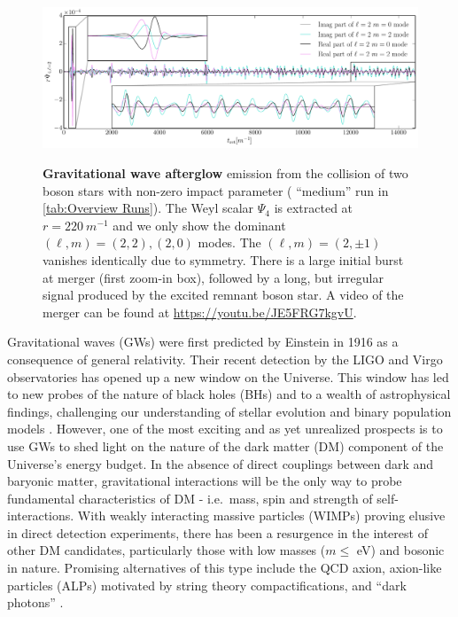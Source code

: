 \documentclass[aps,twocolumn,nofootinbib,superscriptaddress,amsfonts,floatfix
]{revtex4-1} %
\begin{document}
\begin{figure}[t]
\begin{center}
\href{https://youtu.be/JE5FRG7kgvU}{
{\includegraphics[width=2.0\columnwidth]{AllModes.pdf}} }
\caption{{\bf Gravitational wave afterglow} emission from the collision of two boson stars with non-zero impact parameter ( ``medium'' run in \cref{tab:Overview Runs}). The Weyl scalar $\Psi_4$ is extracted at $r=220~m^{-1}$ and we only show the dominant $(\ell,m)=(2,2),(2,0)$ modes. The $(\ell,m)=(2,\pm1)$ vanishes identically due to symmetry. There is a large initial burst at merger (first zoom-in box), followed by a long, but irregular signal produced by the excited remnant boson star.  A video of the merger can be found at \url{https://youtu.be/JE5FRG7kgvU}.
 }

\label{fig:GW_signal}
\end{center}
\end{figure}


Gravitational waves (GWs) were first predicted by Einstein in 1916 as
a consequence of general relativity.  Their recent detection by the
LIGO and Virgo observatories has opened up a new window on the
Universe. This window has led to new probes of the nature of black holes
(BHs) and to a wealth of astrophysical findings, challenging our
understanding of stellar evolution and binary population models \cite{LIGOScientific:2016aoc,LIGOScientific:2018jsj,LIGOScientific:2020kqk,LIGOScientific:2021psn}.
However, one of the most exciting and as yet unrealized prospects is
to use GWs to shed light on the nature of the dark matter (DM)
component of the Universe's energy budget. In the absence of direct
couplings between dark and baryonic matter, gravitational interactions will be the only way to
probe fundamental characteristics of DM - i.e.~mass, spin and strength
of self-interactions.  With weakly interacting massive particles (WIMPs)
proving elusive in direct detection experiments, there has been a resurgence in the interest of other DM
candidates, particularly those with low masses ($m \leq $ eV) and bosonic in nature.
Promising alternatives of this type include the QCD axion, axion-like particles
(ALPs) motivated by string theory compactifications, and ``dark
photons'' \cite{Arkani-Hamed:2008hhe,Feng:2010gw,Marsh:2015xka,Svrcek:2006yi,Kim:1986ax,Arvanitaki:2009fg,Ringwald:2012cu,Wilczek:1977pj,Peccei:1977hh,Weinberg:1977ma}.
\end{document}
